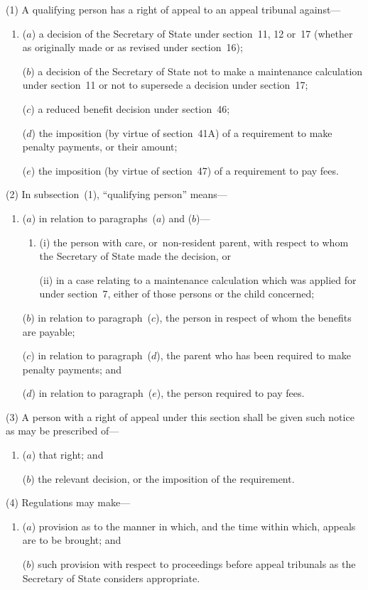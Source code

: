 \documentclass[12pt,a4paper]{article}
\begin{document}
(1) A qualifying person has a right of appeal to an appeal tribunal against—
\begin{enumerate}\item[]
($a$) a decision of the Secretary of State under section~11, 12 or~17 (whether as originally made or as revised under section~16);

($b$) a decision of the Secretary of State not to make a maintenance calculation under section~11 or not to supersede a decision under section~17;

($c$) a reduced benefit decision under section~46;

($d$) the imposition (by virtue of section~41A) of a requirement to make penalty payments, or their amount;

($e$) the imposition (by virtue of section~47) of a requirement to pay fees.
\end{enumerate}

(2) In subsection~(1), “qualifying person” means—
\begin{enumerate}\item[]
($a$) in relation to paragraphs~($a$)  and ($b$)—
\begin{enumerate}\item[]
(i) the person with care, or~non-resident parent, with respect to whom the Secretary of State made the decision, or

(ii) in a case relating to a maintenance calculation which was applied for under section~7, either of those persons or the child concerned;
\end{enumerate}

($b$) in relation to paragraph~($c$), the person in respect of whom the benefits are payable;

($c$) in relation to paragraph~($d$), the parent who has been required to make penalty payments; and

($d$) in relation to paragraph~($e$), the person required to pay fees.
\end{enumerate}

(3) A person with a right of appeal under this section shall be given such notice as may be prescribed of—
\begin{enumerate}\item[]
($a$) that right; and

($b$) the relevant decision, or the imposition of the requirement.
\end{enumerate}

(4) Regulations may make—
\begin{enumerate}\item[]
($a$) provision as to the manner in which, and the time within which, appeals are to be brought; and

($b$) such provision with respect to proceedings before appeal tribunals as the Secretary of State considers appropriate.
\end{enumerate}
\end{document}
